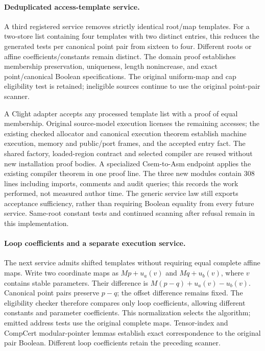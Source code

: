 \paragraph{Deduplicated access-template service.}
A third registered service removes strictly identical root/map templates.
For a two-store list containing four templates with two distinct entries,
this reduces the generated tests per canonical point pair from sixteen to
four. Different roots or affine coefficients/constants remain distinct.
The domain proof establishes membership preservation, uniqueness, length
nonincrease, and exact point/canonical Boolean specifications. The original
uniform-map and cap eligibility test is retained; ineligible sources continue
to use the original point-pair scanner.

A Clight adapter accepts any processed template list with a proof of equal
membership. Original source-model execution licenses the remaining accesses;
the existing checked allocator and canonical execution theorem establish
machine execution, memory and public/port frames, and the accepted entry fact.
The shared factory, loaded-region contract and selected compiler are reused
without new installation proof bodies. A specialized Csem-to-Asm endpoint
applies the existing compiler theorem in one proof line. The three new modules
contain 308 lines including imports, comments and audit queries; this records
the work performed, not measured author time. The generic service law still
exports acceptance sufficiency, rather than requiring Boolean equality from
every future service. Same-root constant tests and continued scanning after
refusal remain in this implementation.

\paragraph{Loop coefficients and a separate execution service.}
The next service admits shifted templates without requiring equal complete
affine maps. Write two coordinate maps as $Mp+u_a(v)$ and $Mq+u_b(v)$,
where $v$ contains stable parameters. Their difference is
$M(p-q)+u_a(v)-u_b(v)$. Canonical point pairs preserve $p-q$; the offset
difference remains fixed. The eligibility checker therefore compares only
loop coefficients, allowing different constants and parameter coefficients.
This normalization selects the algorithm; emitted address tests use the
original complete maps. Tensor-index and CompCert modular-pointer lemmas
establish exact correspondence to the original pair Boolean. Different loop
coefficients retain the preceding scanner.


